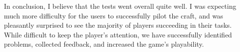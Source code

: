 In conclusion, I believe that the tests went overall quite well.  I was expecting much more difficulty for the users to successfully pilot the craft, and was pleasantly surprised to see the majority of players succeeding in their tasks.  While difficult to keep the player's attention, we have successfully identified problems, collected feedback, and increased the game's playability.





